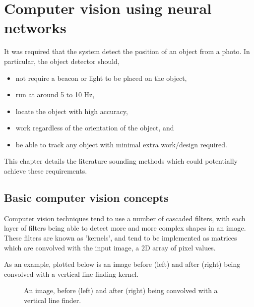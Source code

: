 \section{Computer vision using neural networks}
It was required that the system detect the position of an object from a photo. In particular, the object detector should,

\begin{itemize}
	\item not require a beacon or light to be placed on the object,
	\item run at around 5 to 10 Hz,
	\item locate the object with high accuracy,
	\item work regardless of the orientation of the object, and
	\item be able to track any object with minimal extra work/design required.
\end{itemize}

This chapter details the literature sounding methods which could potentially achieve these requirements.

\subsection{Basic computer vision concepts}
Computer vision techniques tend to use a number of cascaded filters, with each layer of filters being able to detect more and more complex shapes in an image. These filters are known as 'kernels', and tend to be implemented as  matrices which are convolved with the input image, a 2D array of pixel values.

As an example, plotted below is an image before (left) and after (right) being convolved with a vertical line finding kernel.

\begin{figure}[h!]%
    \centering
    \qquad \qquad
    \caption{An image, before (left) and after (right) being convolved with a vertical line finder.}%
    \label{fig:example}%
\end{figure}

